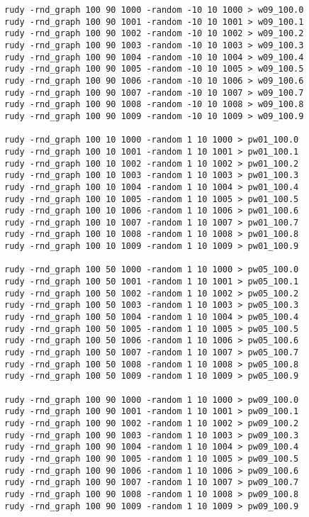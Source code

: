 \documentclass[a4paper, 12pt]{article}
\begin{document}
\begin{tiny}
\begin{verbatim}
rudy -rnd_graph 100 90 1000 -random -10 10 1000 > w09_100.0
rudy -rnd_graph 100 90 1001 -random -10 10 1001 > w09_100.1
rudy -rnd_graph 100 90 1002 -random -10 10 1002 > w09_100.2
rudy -rnd_graph 100 90 1003 -random -10 10 1003 > w09_100.3
rudy -rnd_graph 100 90 1004 -random -10 10 1004 > w09_100.4
rudy -rnd_graph 100 90 1005 -random -10 10 1005 > w09_100.5
rudy -rnd_graph 100 90 1006 -random -10 10 1006 > w09_100.6
rudy -rnd_graph 100 90 1007 -random -10 10 1007 > w09_100.7
rudy -rnd_graph 100 90 1008 -random -10 10 1008 > w09_100.8
rudy -rnd_graph 100 90 1009 -random -10 10 1009 > w09_100.9

rudy -rnd_graph 100 10 1000 -random 1 10 1000 > pw01_100.0
rudy -rnd_graph 100 10 1001 -random 1 10 1001 > pw01_100.1
rudy -rnd_graph 100 10 1002 -random 1 10 1002 > pw01_100.2
rudy -rnd_graph 100 10 1003 -random 1 10 1003 > pw01_100.3
rudy -rnd_graph 100 10 1004 -random 1 10 1004 > pw01_100.4
rudy -rnd_graph 100 10 1005 -random 1 10 1005 > pw01_100.5
rudy -rnd_graph 100 10 1006 -random 1 10 1006 > pw01_100.6
rudy -rnd_graph 100 10 1007 -random 1 10 1007 > pw01_100.7
rudy -rnd_graph 100 10 1008 -random 1 10 1008 > pw01_100.8
rudy -rnd_graph 100 10 1009 -random 1 10 1009 > pw01_100.9

rudy -rnd_graph 100 50 1000 -random 1 10 1000 > pw05_100.0
rudy -rnd_graph 100 50 1001 -random 1 10 1001 > pw05_100.1
rudy -rnd_graph 100 50 1002 -random 1 10 1002 > pw05_100.2
rudy -rnd_graph 100 50 1003 -random 1 10 1003 > pw05_100.3
rudy -rnd_graph 100 50 1004 -random 1 10 1004 > pw05_100.4
rudy -rnd_graph 100 50 1005 -random 1 10 1005 > pw05_100.5
rudy -rnd_graph 100 50 1006 -random 1 10 1006 > pw05_100.6
rudy -rnd_graph 100 50 1007 -random 1 10 1007 > pw05_100.7
rudy -rnd_graph 100 50 1008 -random 1 10 1008 > pw05_100.8
rudy -rnd_graph 100 50 1009 -random 1 10 1009 > pw05_100.9

rudy -rnd_graph 100 90 1000 -random 1 10 1000 > pw09_100.0
rudy -rnd_graph 100 90 1001 -random 1 10 1001 > pw09_100.1
rudy -rnd_graph 100 90 1002 -random 1 10 1002 > pw09_100.2
rudy -rnd_graph 100 90 1003 -random 1 10 1003 > pw09_100.3
rudy -rnd_graph 100 90 1004 -random 1 10 1004 > pw09_100.4
rudy -rnd_graph 100 90 1005 -random 1 10 1005 > pw09_100.5
rudy -rnd_graph 100 90 1006 -random 1 10 1006 > pw09_100.6
rudy -rnd_graph 100 90 1007 -random 1 10 1007 > pw09_100.7
rudy -rnd_graph 100 90 1008 -random 1 10 1008 > pw09_100.8
rudy -rnd_graph 100 90 1009 -random 1 10 1009 > pw09_100.9

\end{verbatim}
\end{tiny}



\end{document}

